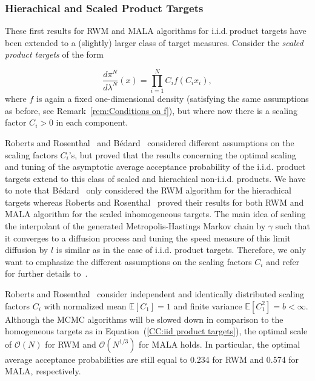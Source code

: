 \subsubsection{Hierachical and Scaled Product Targets} 

These first results for RWM and MALA algorithms for i.i.d.\,product targets have been extended to a (slightly) larger class of target measures. Consider the  \textit{scaled product targets} of the form

\begin{equation}
 \label{CC:Scaled product targets}
 \frac{d \pi^{N}}{d \lambda^{N}}(x) = \prod_{i=1}^{N} C_i f(C_i x_i),
\end{equation}
where $f$ is again a fixed one-dimensional density (satisfying the same assumptions as before, see Remark~\ref{rem:Conditions on f}), but where now there is a scaling factor $C_i > 0$ in each component.

Roberts and Rosenthal~\autocite{Roberts2001} and B\'{e}dard~\autocite{Bedard2007} considered different assumptions on the scaling factors $ C_i $'s, but proved that the results concerning the optimal scaling and tuning of the asymptotic average acceptance probability of the i.i.d. product targets extend to this class of scaled and hierachical non-i.i.d. products. We have to note that B\'{e}dard~\autocite{Bedard2007} only considered the RWM algorithm for the hierachical targets whereas Roberts and Rosenthal~\autocite{Roberts2001} proved their results for both RWM and MALA algorithm for the scaled inhomogeneous targets.
The main idea of scaling the interpolant of the generated Metropolis-Hastings Markov chain by $\gamma$ such that it converges to a diffusion process and tuning the speed measure of this limit diffusion by $l$ is similar as in the case of i.i.d. product targets. Therefore, we only want to emphasize the different assumptions on the scaling factors $C_i$ and refer for further details to~\autocite{Bedard2007, Roberts2001}.


Roberts and Rosenthal~\autocite{Roberts2001} consider independent and identically distributed scaling factors $C_i$ with normalized mean $\mathbb{E}[C_1] = 1$ and finite variance $ \mathbb{E}[C_1^2] = b < \infty $. Although the MCMC algorithms will be slowed down in comparison to the homogeneous targets as in Equation~(\ref{CC:iid product targets}), the optimal scale of $\mathcal{O}(N)$ for RWM and $ \mathcal{O}(N^{1/3}) $ for MALA holds. In particular, the optimal average acceptance probabilities are still equal to 0.234 for RWM and 0.574 for MALA, respectively.


